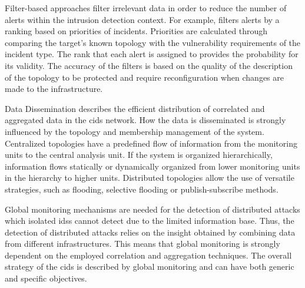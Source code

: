 Filter-based approaches filter irrelevant data in order to reduce the number of alerts within the intrusion detection context. For example, \cite{goo_2002} filters alerts by a ranking based on priorities of incidents. Priorities are calculated through comparing the target's known topology with the vulnerability requirements of the incident type. The rank that each alert is assigned to provides the probability for its validity. The accuracy of the filters is based on the quality of the description of the topology to be protected and require reconfiguration when changes are made to the infrastructure.

Data Dissemination describes the efficient distribution of correlated and aggregated data in the \gls{cids} network. How the data is disseminated is strongly influenced by the topology and membership management of the system. Centralized topologies have a predefined flow of information from the monitoring units to the central analysis unit. If the system is organized hierarchically, information flows statically or dynamically organized from lower monitoring units in the hierarchy to higher units. Distributed topologies allow the use of versatile strategies, such as flooding, selective flooding or publish-subscribe methods.

Global monitoring mechanisms are needed for the detection of distributed attacks which isolated \glspl{ids} cannot detect due to the limited information base. Thus, the detection of distributed attacks relies on the insight obtained by combining data from different infrastructures. This means that global monitoring is strongly dependent on the employed correlation and aggregation techniques. The overall strategy of the \gls{cids} is described by global monitoring and can have both generic and specific objectives. 